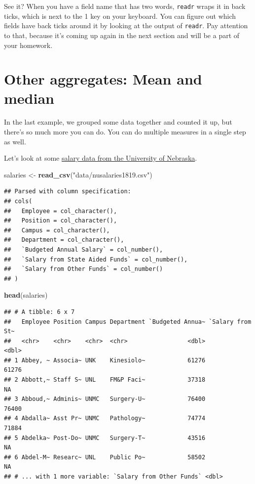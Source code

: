 \documentclass[]{book}
\newenvironment{Shaded}{\begin{snugshade}}{\end{snugshade}}
\newcommand{\KeywordTok}[1]{\textcolor[rgb]{0.13,0.29,0.53}{\textbf{#1}}}
\newcommand{\NormalTok}[1]{#1}
\newcommand{\StringTok}[1]{\textcolor[rgb]{0.31,0.60,0.02}{#1}}
\begin{document}
See it? When you have a field name that has two words, \texttt{readr} wraps it in back ticks, which is next to the 1 key on your keyboard. You can figure out which fields have back ticks around it by looking at the output of \texttt{readr}. Pay attention to that, because it's coming up again in the next section and will be a part of your homework.

\hypertarget{other-aggregates-mean-and-median}{%
\section{Other aggregates: Mean and median}\label{other-aggregates-mean-and-median}}

In the last example, we grouped some data together and counted it up, but there's so much more you can do. You can do multiple measures in a single step as well.

Let's look at some \href{https://unl.box.com/s/09t2u4qoncfh6qlv2156flzlxb8ruzpq}{salary data from the University of Nebraska}.

\begin{Shaded}
\begin{Highlighting}[]
\NormalTok{salaries <-}\StringTok{ }\KeywordTok{read_csv}\NormalTok{(}\StringTok{"data/nusalaries1819.csv"}\NormalTok{)}
\end{Highlighting}
\end{Shaded}

\begin{verbatim}
## Parsed with column specification:
## cols(
##   Employee = col_character(),
##   Position = col_character(),
##   Campus = col_character(),
##   Department = col_character(),
##   `Budgeted Annual Salary` = col_number(),
##   `Salary from State Aided Funds` = col_number(),
##   `Salary from Other Funds` = col_number()
## )
\end{verbatim}

\begin{Shaded}
\begin{Highlighting}[]
\KeywordTok{head}\NormalTok{(salaries)}
\end{Highlighting}
\end{Shaded}

\begin{verbatim}
## # A tibble: 6 x 7
##   Employee Position Campus Department `Budgeted Annua~ `Salary from St~
##   <chr>    <chr>    <chr>  <chr>                 <dbl>            <dbl>
## 1 Abbey, ~ Associa~ UNK    Kinesiolo~            61276            61276
## 2 Abbott,~ Staff S~ UNL    FM&P Faci~            37318               NA
## 3 Abboud,~ Adminis~ UNMC   Surgery-U~            76400            76400
## 4 Abdalla~ Asst Pr~ UNMC   Pathology~            74774            71884
## 5 Abdelka~ Post-Do~ UNMC   Surgery-T~            43516               NA
## 6 Abdel-M~ Researc~ UNL    Public Po~            58502               NA
## # ... with 1 more variable: `Salary from Other Funds` <dbl>
\end{verbatim}
\end{document}
